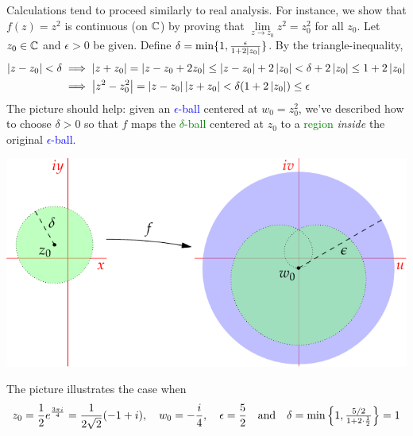 \begin{example}{}{}
	Calculations tend to proceed similarly to real analysis. For instance, we show that $f(z)=z^2$ is continuous (on $\mathbb{C}$) by proving that $\lim\limits_{z\to z_0}z^2=z_0^2$ for all $z_0$.\smallbreak
	Let $z_0\in\mathbb{C}$ and $\epsilon>0$ be given. Define $\delta=\min\{1,\frac\epsilon{1+2\left| z_0\right|}\}$. By the triangle-inequality,
	\begin{align*}
		\left| z-z_0\right|<\delta&\implies \left| z+z_0\right|=\left| z-z_0+2z_0\right|\le \left| z-z_0\right|+2\left| z_0\right|<\delta+2\left| z_0\right|\le 1+2\left| z_0\right|\\
		&\implies \left| z^2-z_0^2\right|=\left| z-z_0\right|\left| z+z_0\right|<\delta(1+2\left| z_0\right|)\le \epsilon
	\end{align*}
	The picture should help: given an \textcolor{blue}{$\epsilon$-ball} centered at $w_0=z_0^2$, we've described how to choose $\delta>0$ so that $f$ maps the \textcolor{Green}{$\delta$-ball} centered at $z_0$ to a \textcolor{Green}{region} \emph{inside} the original \textcolor{blue}{$\epsilon$-ball.}
	\begin{center}
		\includegraphics[scale=0.85]{limits-zsq}
	\end{center}
	The picture illustrates the case when
	\[
		z_0=\frac 12e^{\frac{3\pi i}{4}}=\frac 1{2\sqrt 2}(-1+i),\quad w_0=-\frac i4,\quad \epsilon=\frac 52\quad\text{and}\quad \delta=\min\left\{1,\tfrac{5/2}{1+2\cdot\frac 12}\right\}=1
	\]
\end{example}
\goodbreak


